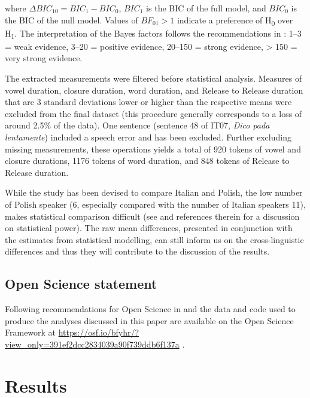 \documentclass[12pt,]{article}
\begin{document}
where \(\Delta{}BIC_{10} = BIC_1 - BIC_0\), \(BIC_1\) is the BIC of the
full model, and \(BIC_0\) is the BIC of the null model. Values of
\(BF_{01} > 1\) indicate a preference of H\textsubscript{0} over
H\textsubscript{1}. The interpretation of the Bayes factors follows the
recommendations in \citet[p.~139]{raftery1995}: 1--3 = weak evidence,
3--20 = positive evidence, 20--150 = strong evidence, \textgreater{} 150
= very strong evidence.

The extracted measurements were filtered before statistical analysis.
Measures of vowel duration, closure duration, word duration, and Release
to Release duration that are 3 standard deviations lower or higher than
the respective means were excluded from the final dataset (this
procedure generally corresponds to a loss of around 2.5\% of the data).
One sentence (sentence 48 of IT07, \emph{Dico pada lentamente}) included
a speech error and has been excluded. Further excluding missing
measurements, these operations yields a total of 920 tokens of vowel and
closure durations, 1176 tokens of word duration, and 848 tokens of
Release to Release duration.

While the study has been devised to compare Italian and Polish, the low
number of Polish speaker (6, especially compared with the number of
Italian speakers 11), makes statistical comparison difficult (see
\citealt{kirby2018} and references therein for a discussion on
statistical power). The raw mean differences, presented in conjunction
with the estimates from statistical modelling, can still inform us on
the cross-linguistic differences and thus they will contribute to the
discussion of the results.

\hypertarget{open-science-statement}{%
\subsection{Open Science statement}\label{open-science-statement}}

Following recommendations for Open Science in \citet{cruwell2018} and
\citet{berez-kroeker2018} the data and code used to produce the analyses
discussed in this paper are available on the Open Science Framework at
\url{https://osf.io/bfyhr/?view_only=391ef2dcc2834039a90f739ddb6f137a}
\citep{coretta2018g}.

\hypertarget{results}{%
\section{Results}\label{results}}
\end{document}
